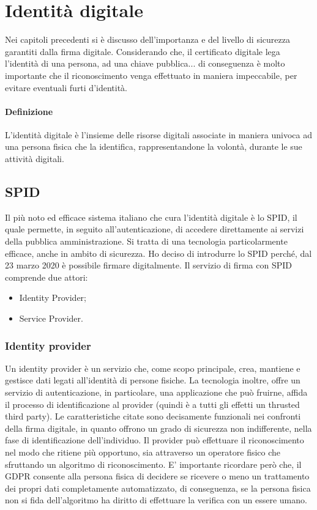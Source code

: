 \chapter{Identità digitale}

Nei capitoli precedenti si è discusso dell'importanza e del livello di sicurezza garantiti dalla firma digitale. Considerando che, il certificato digitale lega l'identità di una persona, ad una chiave pubblica... di conseguenza è molto importante che il riconoscimento venga effettuato in maniera impeccabile, per evitare eventuali furti d'identità.

\subsubsection{Definizione}

L'identità digitale è l'insieme delle risorse digitali associate in maniera univoca ad una persona fisica che la identifica, rappresentandone la volontà, durante le sue attività digitali.

\section{SPID}

Il più noto ed efficace sistema italiano che cura l'identità digitale è lo SPID, il quale permette, in seguito all'autenticazione, di accedere direttamente ai servizi della pubblica amministrazione. Si tratta di una tecnologia particolarmente efficace, anche in ambito di sicurezza. 
Ho deciso di introdurre lo SPID perché, dal 23 marzo 2020 è possibile firmare digitalmente. Il servizio di firma con SPID comprende due attori:
\begin{itemize}
	\item Identity Provider;
	\item Service Provider.
\end{itemize} 

\subsection{Identity provider}

Un identity provider è un servizio che, come scopo principale, crea, mantiene e gestisce dati legati all'identità di persone fisiche. La tecnologia inoltre, offre un servizio di autenticazione, in particolare, una applicazione che può fruirne, affida il processo di identificazione al provider (quindi è a tutti gli effetti un thrusted third party). Le caratteristiche citate sono decisamente funzionali nei confronti della firma digitale, in quanto offrono un grado di sicurezza non indifferente, nella fase di identificazione dell'individuo. Il provider può effettuare il riconoscimento nel modo che ritiene più opportuno, sia attraverso un operatore fisico che sfruttando un algoritmo di riconoscimento. E' importante ricordare però che, il GDPR consente alla persona fisica di decidere se ricevere o meno un trattamento dei propri dati completamente automatizzato, di conseguenza, se la persona fisica non si fida dell'algoritmo ha diritto di effettuare la verifica con un essere umano.

